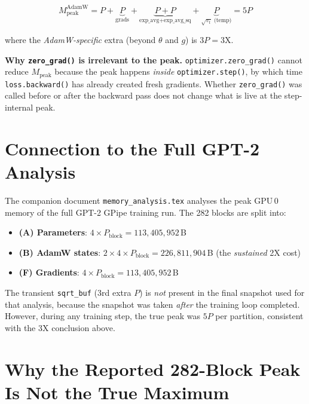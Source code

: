 \documentclass[11pt,a4paper]{article}
\begin{document}
\begin{equation}
\boxed{
  M_{\text{peak}}^{\text{AdamW}} = P + \underbrace{P}_{\text{grads}}
  + \underbrace{P + P}_{\text{exp\_avg} + \text{exp\_avg\_sq}}
  + \underbrace{P}_{\sqrt{v_t}\text{ (temp)}}
  = 5P
}
\label{eq:peak_total}
\end{equation}

\noindent where the \emph{AdamW-specific} extra (beyond $\theta$ and $g$) is
$3P = 3\mathrm{X}$.

\medskip
\noindent\textbf{Why \texttt{zero\_grad()} is irrelevant to the peak.}
\texttt{optimizer.zero\_grad()} cannot reduce $M_\text{peak}$ because the
peak happens \emph{inside} \texttt{optimizer.step()}, by which time
\texttt{loss.backward()} has already created fresh gradients.  Whether
\texttt{zero\_grad()} was called before or after the backward pass does not
change what is live at the step-internal peak.

\section{Connection to the Full GPT-2 Analysis}
\label{sec:connection}

The companion document \texttt{memory\_analysis.tex} analyses the peak
GPU\,0 memory of the full GPT-2 GPipe training run.  The 282 blocks are
split into:

\begin{itemize}
  \item \textbf{(A) Parameters}: $4 \times P_\text{block} = 113{,}405{,}952$\,B
  \item \textbf{(B) AdamW states}: $2 \times 4 \times P_\text{block} = 226{,}811{,}904$\,B
        (the \emph{sustained} 2X cost)
  \item \textbf{(F) Gradients}: $4 \times P_\text{block} = 113{,}405{,}952$\,B
\end{itemize}

The transient \texttt{sqrt\_buf} (3rd extra $P$) is \emph{not} present in
the final snapshot used for that analysis, because the snapshot was taken
\emph{after} the training loop completed.  However, during any training
step, the true peak was $5P$ per partition, consistent with the 3X
conclusion above.

\section{Why the Reported 282-Block Peak Is Not the True Maximum}
\label{sec:notmax}
\end{document}

